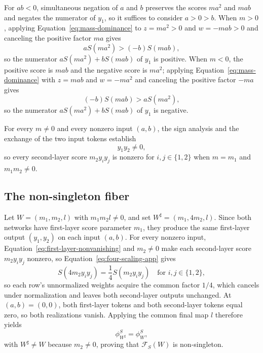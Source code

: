 \documentclass[mlmain]{jmlr}
\newcommand{\cF}{\mathcal{F}}
\begin{document}
For $ab<0$, simultaneous negation of $a$ and $b$ preserves the scores
$ma^2$ and $mab$ and negates the numerator of $y_1$, so it suffices to
consider $a>0>b$.  When $m>0$, applying
Equation~\eqref{eq:mass-dominance} to $z=ma^2>0$ and $w=-mab>0$ and
canceling the positive factor $ma$ gives
\begin{equation}
 aS(ma^2)>(-b)S(mab),
 \label{eq:positive-m-dominance}
\end{equation}
so the numerator $aS(ma^2)+bS(mab)$ of $y_1$ is positive.  When $m<0$, the positive
score is $mab$ and the negative score is $ma^2$; applying
Equation~\eqref{eq:mass-dominance} with $z=mab$ and $w=-ma^2$ and
canceling the positive factor $-ma$ gives
\begin{equation}
 (-b)S(mab)>aS(ma^2),
 \label{eq:negative-m-dominance}
\end{equation}
so the numerator $aS(ma^2)+bS(mab)$ of $y_1$ is negative.

For every $m\ne0$ and every nonzero input $(a,b)$, the sign analysis and
the exchange of the two input tokens establish
\begin{equation}
 y_1y_2\ne0,
 \label{eq:first-layer-nonvanishing}
\end{equation}
so every second-layer score $m_2y_i y_j$ is nonzero for
$i,j\in\{1,2\}$ when $m=m_1$ and $m_1m_2\ne0$.

\subsection{The non-singleton fiber}

Let $W=(m_1,m_2,l)$ with $m_1m_2l\ne0$, and set
$W^\sharp=(m_1,4m_2,l)$.  Since both networks have first-layer score
parameter $m_1$, they produce the same first-layer output $(y_1,y_2)$
on each input $(a,b)$.  For every nonzero input,
Equation~\eqref{eq:first-layer-nonvanishing} and $m_2\ne0$ make each
second-layer score $m_2y_i y_j$ nonzero, so
Equation~\eqref{eq:four-scaling-app} gives
\begin{equation}
 S(4m_2y_i y_j)=\frac14S(m_2y_i y_j)
 \quad\text{for }i,j\in\{1,2\},
 \label{eq:second-layer-scaling}
\end{equation}
so each row's unnormalized weights acquire the common factor $1/4$,
which cancels under normalization and leaves both second-layer outputs
unchanged.  At $(a,b)=(0,0)$, both first-layer tokens and both second-layer
tokens equal zero, so both realizations vanish.  Applying the common
final map $l$ therefore yields
\begin{equation}
 \phi_{W^\sharp}^S=\phi_W^S,
 \label{eq:counterexample-fiber-equality}
\end{equation}
with $W^\sharp\ne W$ because $m_2\ne0$, proving that $\cF_S(W)$ is
non-singleton.
\end{document}
